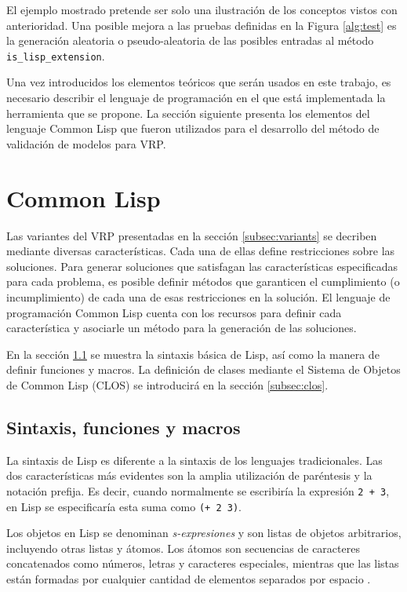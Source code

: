 El ejemplo mostrado pretende ser solo una ilustración de los conceptos vistos con anterioridad. Una posible mejora a las pruebas definidas en la Figura \ref{alg:test} es la generación aleatoria o pseudo-aleatoria de las posibles entradas al método {\tt is\_lisp\_extension}.

Una vez introducidos los elementos teóricos que serán usados en este trabajo, es necesario describir el lenguaje de programación en el que está implementada la herramienta que se propone. La sección siguiente presenta los elementos del lenguaje Common Lisp que fueron utilizados para el desarrollo del método de validación de modelos para VRP.

\section{Common Lisp}\label{sec:lisp}

Las variantes del VRP presentadas en la sección \ref{subsec:variants} se decriben mediante diversas características. Cada una de ellas define restricciones sobre las soluciones. Para generar soluciones que satisfagan las características especificadas para cada problema, es posible definir métodos que garanticen el cumplimiento (o incumplimiento) de cada una de esas restricciones en la solución. El lenguaje de programación Common Lisp cuenta con los recursos para definir cada característica y asociarle un método para la generación de las soluciones.

En la sección \ref{subsec:lispIntro} se muestra la sintaxis básica de Lisp, así como la manera de definir funciones y macros. La definición de clases mediante el Sistema de Objetos de Common Lisp (CLOS) se introducirá en la sección \ref{subsec:clos}.

\subsection{Sintaxis, funciones y macros}\label{subsec:lispIntro}
La sintaxis de Lisp es diferente a la sintaxis de los lenguajes tradicionales. Las dos características más evidentes son la amplia utilización de paréntesis y la notación prefija. Es decir, cuando normalmente se escribiría la expresión {\tt 2 + 3}, en Lisp se especificaría esta suma como {\tt (+ 2 3)}.

Los objetos en Lisp se denominan {\it s-expresiones} y son listas de objetos arbitrarios, incluyendo otras listas y átomos. Los átomos son secuencias de caracteres concatenados como números, letras y caracteres especiales, mientras que las listas están formadas por cualquier cantidad de elementos separados por espacio \cite{seibel@practicalCL}.


